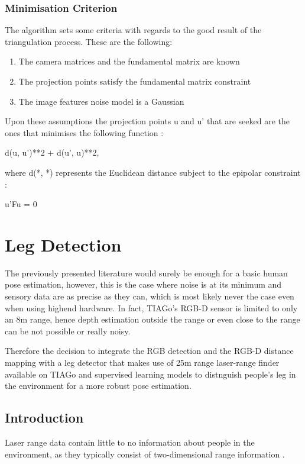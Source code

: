 \subsubsection{Minimisation Criterion}

The algorithm sets some criteria with regards to the good result of the triangulation process. These are the following:

\begin{enumerate}
  \item The camera matrices and the fundamental matrix are known
  \item The projection points satisfy the fundamental matrix constraint
  \item The image features noise model is a Gaussian
\end{enumerate}

Upon these assumptions the projection points u and u' that are seeked are the ones that minimises the following function \cite{hartley1997triangulation}:

d(u, u')**2 + d(u', u)**2,

where d(*, *) represents the Euclidean distance subject to the epipolar constraint \cite{hartley1997triangulation}:

u'Fu = 0

\section{Leg Detection}

The previously presented literature would surely be enough for a basic human pose estimation, however, this is the case where noise is at its minimum and sensory data are as precise as they can, which is most likely never the case even when using highend hardware. In fact, TIAGo's RGB-D sensor is limited to only an 8m range, hence depth estimation outside the range or even close to the range can be not possible or really noisy.

Therefore the decision to integrate the RGB detection and the RGB-D distance mapping with a leg detector that makes use of 25m range laser-range finder available on TIAGo and supervised learning models to distnguish people's leg in the environment for a more robust pose estimation.

\subsection{Introduction}

Laser range data contain little to no information about people in the environment, as they typically consist of two-dimensional range information \cite{arras2007using}.

